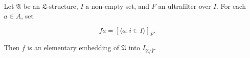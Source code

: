 Let $\mathfrak{A}$ be an $\mathfrak{L}$-structure, $I$ a non-empty set, and $F$ an ultrafilter over $I$. For each $a \in A$, set

$$fa = [\langle a : i \in I \rangle]_{\overline{F}}.$$

Then $f$ is an elementary embedding of $\mathfrak{A}$ into $I_{\mathfrak{A}/\overline{F}}$.
